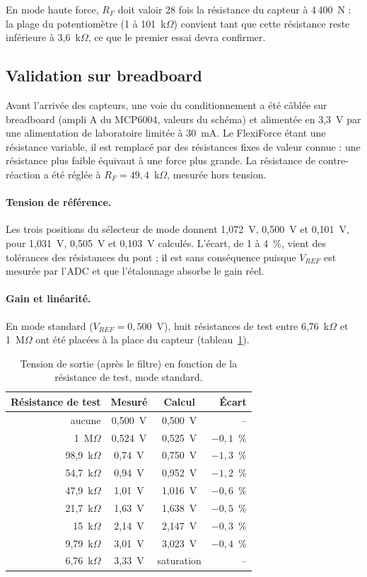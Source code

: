 En mode haute force, $R_F$ doit valoir 28 fois la résistance du capteur à 4\,400~N : la plage du potentiomètre (1 à 101~k$\Omega$) convient tant que cette résistance reste inférieure à 3,6~k$\Omega$, ce que le premier essai devra confirmer.

\subsection{Validation sur breadboard}

Avant l'arrivée des capteurs, une voie du conditionnement a été câblée sur breadboard (ampli A du MCP6004, valeurs du schéma) et alimentée en 3,3~V par une alimentation de laboratoire limitée à 30~mA. Le FlexiForce étant une résistance variable, il est remplacé par des résistances fixes de valeur connue : une résistance plus faible équivaut à une force plus grande. La résistance de contre-réaction a été réglée à $R_F = 49{,}4$~k$\Omega$, mesurée hors tension.

\paragraph{Tension de référence.} Les trois positions du sélecteur de mode donnent 1,072~V, 0,500~V et 0,101~V, pour 1,031~V, 0,505~V et 0,103~V calculés. L'écart, de 1 à 4~\%, vient des tolérances des résistances du pont ; il est sans conséquence puisque $V_{REF}$ est mesurée par l'ADC et que l'étalonnage absorbe le gain réel.

\paragraph{Gain et linéarité.} En mode standard ($V_{REF} = 0{,}500$~V), huit résistances de test entre 6,76~k$\Omega$ et 1~M$\Omega$ ont été placées à la place du capteur (tableau~\ref{tab:breadboard}).

\begin{table}[H]
\centering
\begin{tabular}{@{}rccr@{}}
\toprule
\textbf{Résistance de test} & \textbf{Mesuré} & \textbf{Calcul} & \textbf{Écart} \\
\midrule
aucune & 0,500~V & 0,500~V & -- \\
1~M$\Omega$ & 0,524~V & 0,525~V & $-0{,}1$~\% \\
98,9~k$\Omega$ & 0,74~V & 0,750~V & $-1{,}3$~\% \\
54,7~k$\Omega$ & 0,94~V & 0,952~V & $-1{,}2$~\% \\
47,9~k$\Omega$ & 1,01~V & 1,016~V & $-0{,}6$~\% \\
21,7~k$\Omega$ & 1,63~V & 1,638~V & $-0{,}5$~\% \\
15~k$\Omega$ & 2,14~V & 2,147~V & $-0{,}3$~\% \\
9,79~k$\Omega$ & 3,01~V & 3,023~V & $-0{,}4$~\% \\
6,76~k$\Omega$ & 3,33~V & saturation & -- \\
\bottomrule
\end{tabular}
\caption{Tension de sortie (après le filtre) en fonction de la résistance de test, mode standard.}
\label{tab:breadboard}
\end{table}

